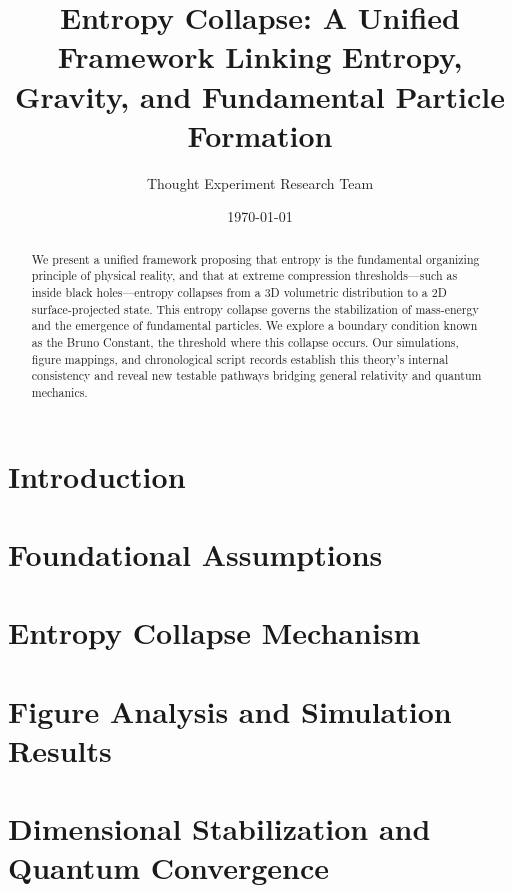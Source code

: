 \documentclass[12pt]{article}
\title{Entropy Collapse: A Unified Framework Linking Entropy, Gravity, and Fundamental Particle Formation}
\author{Thought Experiment Research Team}
\date{\today}
\begin{document}
\maketitle

\begin{abstract}
We present a unified framework proposing that entropy is the fundamental organizing principle of physical reality, and that at extreme compression thresholds—such as inside black holes—entropy collapses from a 3D volumetric distribution to a 2D surface-projected state. This entropy collapse governs the stabilization of mass-energy and the emergence of fundamental particles. We explore a boundary condition known as the Bruno Constant, the threshold where this collapse occurs. Our simulations, figure mappings, and chronological script records establish this theory’s internal consistency and reveal new testable pathways bridging general relativity and quantum mechanics.
\end{abstract}

\tableofcontents

\section{Introduction}
\label{sec:intro}


\section{Foundational Assumptions}
\label{sec:foundations}


\section{Entropy Collapse Mechanism}
\label{sec:mechanism}


\section{Figure Analysis and Simulation Results}
\label{sec:figures}


\section{Dimensional Stabilization and Quantum Convergence}
\label{sec:dimensional}
\end{document}
